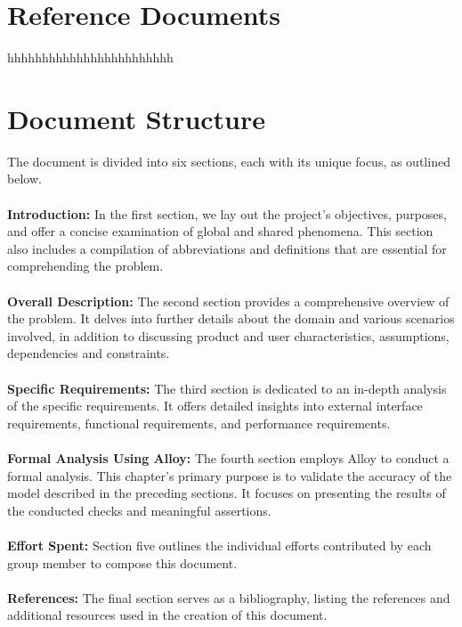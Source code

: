 \section{Reference Documents}
\label{sec:reference_documents}%
hhhhhhhhhhhhhhhhhhhhhhhh

\section{Document Structure}
\label{sec:document_structure}%
\noindent The document is divided into six sections, each with its unique focus, as outlined below.\\\\
\textbf{Introduction:} In the first section, we lay out the project's objectives, purposes, and offer a concise examination of global and shared phenomena. This section also includes a compilation of abbreviations and definitions that are essential for comprehending the problem.\\\\
\textbf{Overall Description:} The second section provides a comprehensive overview of the problem. It delves into further details about the domain and various scenarios involved, in addition to discussing product and user characteristics, assumptions, dependencies and constraints.\\\\
\textbf{Specific Requirements:} The third section is dedicated to an in-depth analysis of the specific requirements. It offers detailed insights into external interface requirements, functional requirements, and performance requirements.\\\\
\textbf{Formal Analysis Using Alloy:} The fourth section employs Alloy to conduct a formal analysis. This chapter's primary purpose is to validate the accuracy of the model described in the preceding sections. It focuses on presenting the results of the conducted checks and meaningful assertions.\\\\
\textbf{Effort Spent:} Section five outlines the individual efforts contributed by each group member to compose this document.\\\\
\textbf{References:} The final section serves as a bibliography, listing the references and additional resources used in the creation of this document.

